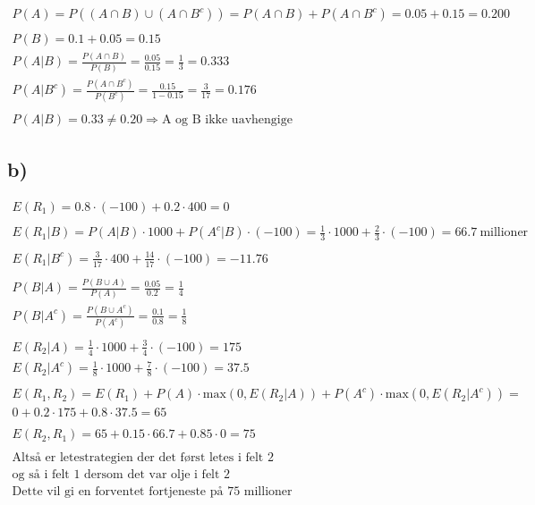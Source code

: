 \begin{gather*}
	P(A) = P((A \cap B) \cup (A \cap B^c)) = P(A \cap B) + P(A \cap B^c) = 0.05 + 0.15 = 0.200
	\\
	\\
	P(B) = 0.1 + 0.05 = 0.15
	\\
	P(A | B) = \frac{P(A \cap B)}{P(B)} = \frac{0.05}{0.15} = \frac{1}{3} = 0.333
	\\
	P(A | B^c) = \frac{P(A \cap B^c)}{P(B^c)} = \frac{0.15}{1 - 0.15} = \frac{3}{17} = 0.176
	\\
	\\
	P(A | B) = 0.33 \neq 0.20 \Rightarrow \text{A og B ikke uavhengige}
\end{gather*}


\subsection*{b)}


\begin{gather*}
	E(R_1) = 0.8 \cdot (-100) + 0.2 \cdot 400 = 0
	\\
	\\
	E(R_1 | B) = P(A | B) \cdot 1000 + P(A^c | B) \cdot (-100)
	=
	\frac{1}{3} \cdot 1000 + \frac{2}{3} \cdot (-100) = 66.7\ \text{millioner}
	\\
	\\
	E(R_1 | B^c) = \frac{3}{17} \cdot 400 + \frac{14}{17} \cdot (-100) = -11.76
	\\
	\\
	P(B | A) = \frac{P(B \cup A)}{P(A)} = \frac{0.05}{0.2} = \frac{1}{4}
	\\
	P(B | A^c) = \frac{P(B \cup A^c)}{P(A^c)} = \frac{0.1}{0.8} = \frac{1}{8}
	\\
	\\
	E(R_2 | A) = \frac{1}{4} \cdot 1000 + \frac{3}{4} \cdot (-100) = 175
	\\
	E(R_2 | A^c) = \frac{1}{8} \cdot 1000 + \frac{7}{8} \cdot (-100) = 37.5
	\\
	\\
	E(R_1, R_2) = E(R_1) + P(A) \cdot \text{max}(0, E(R_2 | A)) + P(A^c) \cdot \text{max}(0, E(R_2 | A^c))
	=
	\\
	0 + 0.2 \cdot 175 + 0.8 \cdot 37.5 = 65
	\\
	\\
	E(R_2, R_1) = 65 + 0.15 \cdot 66.7 + 0.85 \cdot 0 = 75
	\\
	\\
	\text{Altså er letestrategien der det først letes i felt 2}
	\\
	\text{og så i felt 1 dersom det var olje i felt 2}
	\\
	\text{Dette vil gi en forventet fortjeneste på 75 millioner}
\end{gather*}


